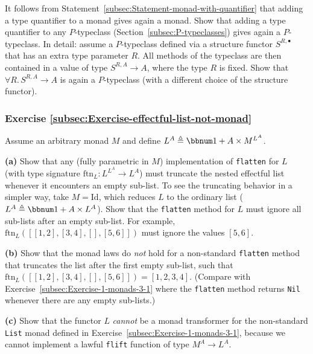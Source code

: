 It follows from Statement~\ref{subsec:Statement-monad-with-quantifier}
that adding a type quantifier to a monad gives again a monad. Show
that adding a type quantifier to any $P$-typeclass (Section~\ref{subsec:P-typeclasses})
gives again a $P$-typeclass. In detail: assume a $P$-typeclass defined
via a structure functor $S^{R,\bullet}$ that has an extra type parameter
$R$. All methods of the typeclass are then contained in a value of
type $S^{R,A}\rightarrow A$, where the type $R$ is fixed. Show that
$\forall R.\,S^{R,A}\rightarrow A$ is again a $P$-typeclass (with
a different choice of the structure functor).

\subsubsection{Exercise \label{subsec:Exercise-effectful-list-not-monad}\ref{subsec:Exercise-effectful-list-not-monad}}

Assume an arbitrary monad $M$ and define $L^{A}\triangleq\bbnum 1+A\times M^{L^{A}}$.

\textbf{(a)} Show that any (fully parametric in $M$) implementation
of \lstinline!flatten! for $L$ (with type signature $\text{ftn}_{L}:L^{L^{A}}\rightarrow L^{A}$)
must truncate the nested effectful list whenever it encounters an
empty sub-list. To see the truncating behavior in a simpler way, take
$M=\text{Id}$, which reduces $L$ to the ordinary list ($L^{A}\triangleq\bbnum 1+A\times L^{A}$).
Show that the \lstinline!flatten! method for $L$ must ignore all
sub-lists after an empty sub-list. For example, $\text{ftn}_{L}(\left[\left[1,2\right],\left[3,4\right],\left[\right],\left[5,6\right]\right])$
must ignore the values $\left[5,6\right]$.

\textbf{(b)} Show that the monad laws do \emph{not} hold for a non-standard
\lstinline!flatten! method that truncates the list after the first
empty sub-list, such that $\text{ftn}_{L}(\left[\left[1,2\right],\left[3,4\right],\left[\right],\left[5,6\right]\right])=\left[1,2,3,4\right]$.
(Compare with Exercise~\ref{subsec:Exercise-1-monads-3-1} where
the \lstinline!flatten! method returns \lstinline!Nil! whenever
there are any empty sub-lists.)

\textbf{(c)} Show that the functor $L$ \emph{cannot} be a monad transformer
for the non-standard \lstinline!List! monad defined in Exercise~\ref{subsec:Exercise-1-monads-3-1},
because we cannot implement a lawful \lstinline!flift! function of
type $M^{A}\rightarrow L^{A}$.

